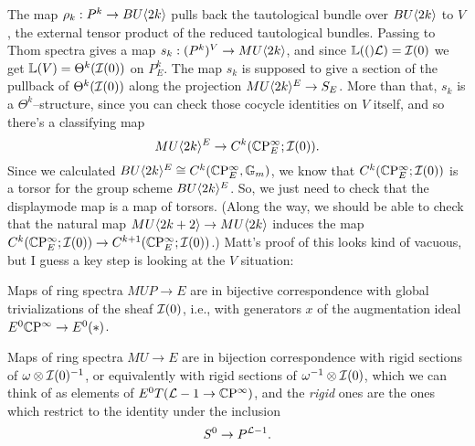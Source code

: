  The map $\rho_k: P^k \to BU\langle2k\rangle$ pulls back the tautological bundle over $BU\langle2k\rangle$ to $V$, the external tensor product of the reduced tautological bundles.  Passing to Thom spectra gives a map $s_k: (P^k)^V \to MU\langle2k\rangle$, and since $\mathbb{L}(()\mathcal{L}) = \mathcal{I}(0)$ we get $\mathbb{L}(V) = \Theta^k(\mathcal{I}(0))$ on $P^k_E$.  The map $s_k$ is supposed to give a section of the pullback of $\Theta^k(\mathcal{I}(0))$ along the projection $MU\langle2k\rangle^E \to S_E$.  More than that, $s_k$ is a $\Theta^k$--structure, since you can check those cocycle identities on $V$ itself, and so there's a classifying map \[MU\langle2k\rangle^E \to C^k(\mathbb{C}\mathrm P^\infty_E; \mathcal{I}(0)).\]  Since we calculated $BU\langle2k\rangle^E \cong C^k(\mathbb{C}\mathrm P^\infty_E, \mathbb G_m)$, we know that $C^k(\mathbb{C}\mathrm P^\infty_E; \mathcal{I}(0))$ is a torsor for the group scheme $BU\langle2k\rangle^E$.  So, we just need to check that the displaymode map is a map of torsors.  (Along the way, we should be able to check that the natural map $MU\langle2k+2\rangle \to MU\langle2k\rangle$ induces the map $C^k(\mathbb{C}\mathrm P^\infty_E; \mathcal{I}(0)) \to C^{k+1}(\mathbb{C}\mathrm P^\infty_E; \mathcal{I}(0))$.)  Matt's proof of this looks kind of vacuous, but I guess a key step is looking at the $V$ situation:
\begin{center}
\end{center}

 Maps of ring spectra $MUP \to E$ are in bijective correspondence with global trivializations of the sheaf $\mathcal{I}(0)$, i.e., with generators $x$ of the augmentation ideal $E^0 \mathbb{C}\mathrm P^\infty \to E^0(*)$.


  Maps of ring spectra $MU \to E$ are in bijection correspondence with rigid sections of $\omega \otimes \mathcal{I}(0)^{-1}$, or equivalently with rigid sections of $\omega^{-1} \otimes \mathcal{I}(0)$, which we can think of as elements of $E^0 T(\mathcal{L} - 1 \to \mathbb{C}\mathrm P^\infty)$, and the \emph{rigid} ones are the ones which restrict to the identity under the inclusion \[S^0 \to P^{\mathcal{L}-1}.\]


